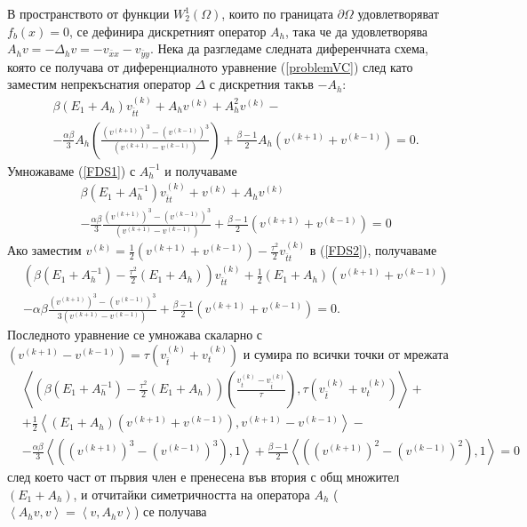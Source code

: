 \documentclass[a4paper]{article}
\newcommand{\rf}[1]{(\ref{#1})}
\theoremstyle{remark}
\begin{document}
\begin{large}
В пространството от функции $W^1_2(\Omega)$, които по границата $\partial\Omega$ удовлетворяват $f_b(x) = 0$, се дефинира дискретният оператор $A_h$, така че да удовлетворява $A_h v=-\Delta_h v=-v_{\bar{x}x} - v_{\bar{y}y}$. Нека да разгледаме следната диференчната схема, която се получава от диференциалното уравнение \rf{problemVC} след като заместим непрекъснатия оператор $\Delta$ с дискретния такъв $-A_h$:
\begin{align}\label{FDS1}
&\beta (E_1+A_h)v_{\bar{t}t}^{(k)} + A_hv^{(k)}+A_h^2 v^{(k)} -\nonumber\\
&-\frac{\alpha \beta}{3} A_h\left(\frac{(v^{(k+1)})^3-(v^{(k-1)})^3}{(v^{(k+1)}-v^{(k-1)})} \right) + \frac{\beta - 1}{2}A_h\left( v^{(k+1)}+v^{(k-1)} \right) =0.
\end{align}
Умножаваме \rf{FDS1} с $A_h^{-1}$ и получаваме
\begin{align}\label{FDS2}
&\beta (E_1+A_h^{-1})v_{\bar{t}t}^{(k)} + v^{(k)}+A_h v^{(k)} \nonumber\\
&-\frac{\alpha \beta}{3} \frac{(v^{(k+1)})^3-(v^{(k-1)})^3}{(v^{(k+1)}-v^{(k-1)})} + \frac{\beta - 1}{2}\left( v^{(k+1)} + v^{(k-1)} \right)= 0
\end{align}
Ако заместим $v^{(k)}=\frac{1}{2}(v^{(k+1)}+v^{(k-1)})-\frac{\tau^2}{2}v_{\bar{t}t}^{(k)}$ в \rf{FDS2}, получаваме
\begin{align*}
&\left( \beta (E_1+A_h^{-1})- \frac{\tau^2}{2}(E_1+A_h ) \right)v_{\bar{t}t}^{(k)}  + \frac{1}{2} (E_1 +A_h )(v^{(k+1)}+v^{(k-1)}) \\
&-\alpha \beta \frac{(v^{(k+1)})^3-(v^{(k-1)})^3}{3(v^{(k+1)}-v^{(k-1)})} + \frac{\beta - 1}{2}\left( v^{(k+1)}+v^{(k-1)} \right) = 0.
\end{align*}
Последното уравнение се умножава скаларно с $(v^{(k+1)}-v^{(k-1)})=\tau (v_{\bar{t}}^{(k)} + v_{t}^{(k)})$ и сумира по всички точки от мрежата
\begin{align*}
&\left< \left( \beta (E_1+A_h^{-1})- \frac{\tau^2}{2}( E_1+A_h ) \right) \left( \frac{v_{t}^{(k)} - v_{\bar t}^{(k)}}{\tau}   \right ), \tau (v_{\bar{t}}^{(k)} + v_{t}^{(k)}) \right>  + \\
& +\frac{1}{2} \left<  (E_1 +A_h ) \left( v^{(k+1)} + v^{(k-1)} \right ) , v^{(k+1)} - v^{(k-1)} \right> - \\
&- \frac{\alpha \beta}{3} \left< \left( (v^{(k+1)})^3-(v^{(k-1)})^3 \right), 1 \right> + \frac{\beta - 1}{2} \left< \left( (v^{(k+1)})^2-(v^{(k-1)})^2 \right), 1 \right> =0
\end{align*}
след което част от първия член е пренесена във втория с общ множител $(E_1 + A_h )$, и отчитайки симетричността на оператора $A_h$ ($\left< A_h v,v\right> = \left< v, A_h v\right>$) се получава

\end{large}
\end{document}

